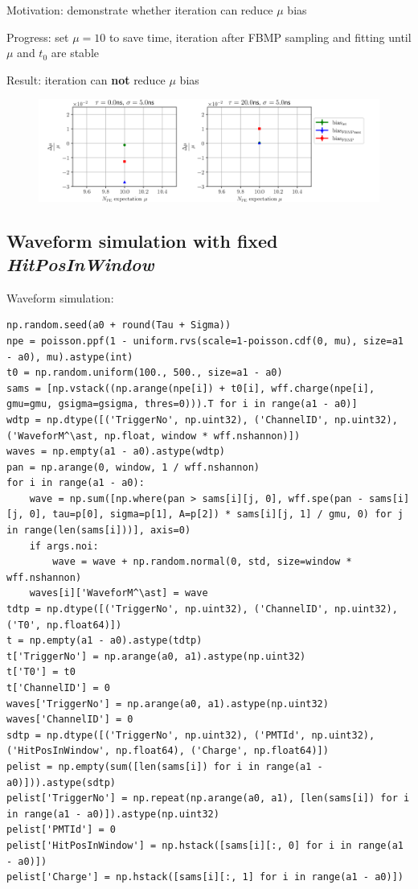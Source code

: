 \documentclass[notitlepage]{article}
\begin{document}
Motivation: demonstrate whether iteration can reduce $\mu$ bias

Progress: set $\mu=10$ to save time, iteration after FBMP sampling and fitting until $\mu$ and $t_0$ are stable

Result: iteration can \textbf{not} reduce $\mu$ bias

\begin{figure}[H]
    \centering
    \includegraphics[width=\textwidth]{vs-biasmu-iter.png}
\end{figure}

\subsection{Waveform simulation with fixed \textit{HitPosInWindow}}

Waveform simulation:

\begin{lstlisting}
np.random.seed(a0 + round(Tau + Sigma))
npe = poisson.ppf(1 - uniform.rvs(scale=1-poisson.cdf(0, mu), size=a1 - a0), mu).astype(int)
t0 = np.random.uniform(100., 500., size=a1 - a0)
sams = [np.vstack((np.arange(npe[i]) + t0[i], wff.charge(npe[i], gmu=gmu, gsigma=gsigma, thres=0))).T for i in range(a1 - a0)]
wdtp = np.dtype([('TriggerNo', np.uint32), ('ChannelID', np.uint32), ('WaveforM^\ast, np.float, window * wff.nshannon)])
waves = np.empty(a1 - a0).astype(wdtp)
pan = np.arange(0, window, 1 / wff.nshannon)
for i in range(a1 - a0):
    wave = np.sum([np.where(pan > sams[i][j, 0], wff.spe(pan - sams[i][j, 0], tau=p[0], sigma=p[1], A=p[2]) * sams[i][j, 1] / gmu, 0) for j in range(len(sams[i]))], axis=0)
    if args.noi:
        wave = wave + np.random.normal(0, std, size=window * wff.nshannon)
    waves[i]['WaveforM^\ast] = wave
tdtp = np.dtype([('TriggerNo', np.uint32), ('ChannelID', np.uint32), ('T0', np.float64)])
t = np.empty(a1 - a0).astype(tdtp)
t['TriggerNo'] = np.arange(a0, a1).astype(np.uint32)
t['T0'] = t0
t['ChannelID'] = 0
waves['TriggerNo'] = np.arange(a0, a1).astype(np.uint32)
waves['ChannelID'] = 0
sdtp = np.dtype([('TriggerNo', np.uint32), ('PMTId', np.uint32), ('HitPosInWindow', np.float64), ('Charge', np.float64)])
pelist = np.empty(sum([len(sams[i]) for i in range(a1 - a0)])).astype(sdtp)
pelist['TriggerNo'] = np.repeat(np.arange(a0, a1), [len(sams[i]) for i in range(a1 - a0)]).astype(np.uint32)
pelist['PMTId'] = 0
pelist['HitPosInWindow'] = np.hstack([sams[i][:, 0] for i in range(a1 - a0)])
pelist['Charge'] = np.hstack([sams[i][:, 1] for i in range(a1 - a0)])
\end{lstlisting}
\end{document}
